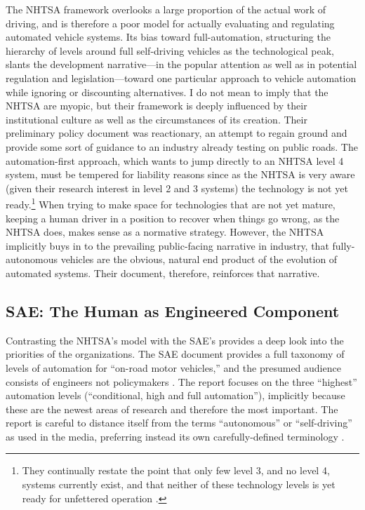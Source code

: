 The NHTSA framework overlooks a large proportion of the actual work of
driving, and is therefore a poor model for actually evaluating and
regulating automated vehicle systems. Its bias toward
full-automation, structuring the hierarchy of levels around full
self-driving vehicles as the technological peak, slants the
development narrative---in the popular attention as well as in
potential regulation and legislation---toward one particular approach
to vehicle automation while ignoring or discounting alternatives. I do
not mean to imply that the NHTSA are myopic, but their framework is
deeply influenced by their institutional culture as well as the
circumstances of its creation. Their preliminary policy document was
reactionary, an attempt to regain ground and provide some sort of guidance to an
industry already testing on public roads. The automation-first
approach, which wants to jump directly to an NHTSA level 4 system,
must be tempered for liability reasons since as the 
NHTSA is very aware (given their research interest in level 2 and 3
systems) the technology is not yet ready.\footnote{They continually
  restate the point that only few level 3, and no level 4, systems
  currently exist, and that neither of these technology levels is yet
  ready for unfettered operation \cite[p. 10, 14]{NHTSA}.} When trying to make space for
technologies that are not yet mature, keeping a human driver in a
position to recover when things go wrong, as the NHTSA does, makes sense as a normative
strategy. However, the NHTSA implicitly buys in to the prevailing
public-facing narrative in industry, that fully-autonomous vehicles
are the obvious, natural end product of the evolution of automated
systems. Their document, therefore, reinforces that narrative.

\subsection{SAE: The Human as Engineered Component}

Contrasting the NHTSA's model with the SAE's provides a deep look into
the priorities of the organizations. The SAE document provides a full
taxonomy of levels of automation for ``on-road motor vehicles,'' and the
presumed audience consists of engineers not policymakers \cite{SAE}. The report
focuses on the three ``highest'' automation levels (``conditional, high
and full automation''), implicitly because these are the newest areas
of research and therefore the most important. The report is careful to
distance itself from the terms ``autonomous'' or ``self-driving'' as used
in the media, preferring instead its own carefully-defined
terminology \cite[p. 5-6]{SAE}. 

